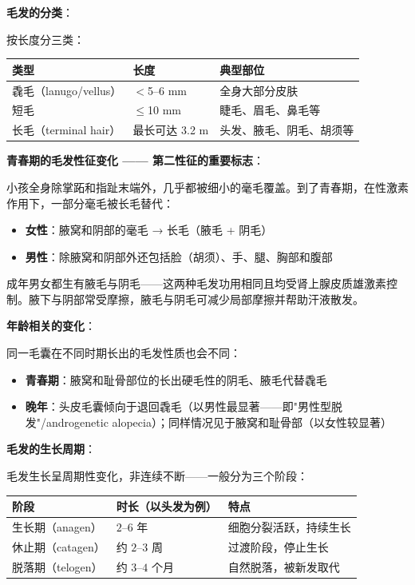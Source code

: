 \vspace{0.5em}
\noindent\textbf{毛发的分类}：

按长度分三类：
\begin{center}\small
\begin{tabular}{|l|l|p{6cm}|}
\hline
类型 & 长度 & 典型部位 \\
\hline
毳毛（lanugo/vellus） & $<$5--6 mm & 全身大部分皮肤 \\
短毛 & $\leq$10 mm & 睫毛、眉毛、鼻毛等 \\
长毛（terminal hair）& 最长可达 3.2 m & 头发、腋毛、阴毛、胡须等 \\
\hline
\end{tabular}
\end{center}

\vspace{0.5em}
\noindent\textbf{青春期的毛发性征变化 —— 第二性征的重要标志}：

小孩全身除掌跖和指趾末端外，几乎都被细小的毫毛覆盖。到了青春期，在性激素作用下，一部分毫毛被长毛替代：
\begin{itemize}
	\item \textbf{女性}：腋窝和阴部的毫毛 → 长毛（腋毛 + 阴毛）
	\item \textbf{男性}：除腋窝和阴部外还包括脸（胡须）、手、腿、胸部和腹部
\end{itemize}

成年男女都生有腋毛与阴毛——这两种毛发功用相同且均受肾上腺皮质雄激素控制。腋下与阴部常受摩擦，腋毛与阴毛可减少局部摩擦并帮助汗液散发。

\vspace{0.5em}
\noindent\textbf{年龄相关的变化}：

同一毛囊在不同时期长出的毛发性质也会不同：
\begin{itemize}
	\item \textbf{青春期}：腋窝和耻骨部位的长出硬毛性的阴毛、腋毛代替毳毛
	\item \textbf{晚年}：头皮毛囊倾向于退回毳毛（以男性最显著——即"男性型脱发"/androgenetic alopecia）；同样情况见于腋窝和耻骨部（以女性较显著）
\end{itemize}

\vspace{0.5em}
\noindent\textbf{毛发的生长周期}：

毛发生长呈周期性变化，非连续不断——一般分为三个阶段：

\begin{center}\small
\begin{tabular}{|l|p{4cm}|p{5cm}|}
\hline
阶段 & 时长（以头发为例） & 特点 \\
\hline
生长期（anagen） & $2$--$6$ 年 & 细胞分裂活跃，持续生长 \\
休止期（catagen） & 约 $2$--$3$ 周 & 过渡阶段，停止生长 \\
脱落期（telogen） & 约 $3$--$4$ 个月 & 自然脱落，被新发取代 \\
\hline
\end{tabular}
\end{center}

